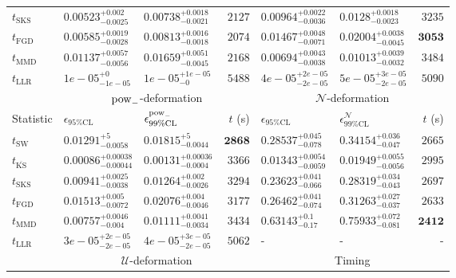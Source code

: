 \begin{tabular}{l|llr|llr}
	$t_{\mathrm{SKS}}$ & $0.00523_{-0.0025}^{+0.002}$ & $0.00738_{-0.0021}^{+0.0018}$ & $2127$ & $0.00964_{-0.0036}^{+0.0022}$ & $0.0128_{-0.0023}^{+0.0018}$ & $3235$ \\
	$t_{\mathrm{FGD}}$ & $0.00585_{-0.0028}^{+0.0019}$ & $0.00813_{-0.0018}^{+0.0016}$ & $2074$ & $0.01467_{-0.0071}^{+0.0048}$ & $0.02004_{-0.0045}^{+0.0038}$ & ${\mathbf{3053}}$ \\
	$t_{\mathrm{MMD}}$ & $0.01137_{-0.0056}^{+0.0057}$ & $0.01659_{-0.0045}^{+0.0051}$ & $2168$ & $0.00694_{-0.0038}^{+0.0043}$ & $0.01013_{-0.0032}^{+0.0039}$ & $3484$ \\
	$t_{\mathrm{LLR}}$ & $1e-05_{-1e-05}^{+0}$ & $1e-05_{-0}^{+1e-05}$ & $5488$ & $4e-05_{-2e-05}^{+2e-05}$ & $5e-05_{-2e-05}^{+3e-05}$ & $5090$ \\
	\toprule
	\multicolumn{1}{c}{} & \multicolumn{3}{c}{$\rm{pow}_{-}$-deformation} & \multicolumn{3}{c}{$\mathcal{N}$-deformation} \\
	Statistic & $\epsilon_{95\%\mathrm{CL}}$ & $\epsilon^  {\rm{pow}_{-}}_{99\%\mathrm{CL}}$ & $t$ (s) & $\epsilon_{95\%\mathrm{CL}}$ & $\epsilon^    {\mathcal{N}}_{99\%\mathrm{CL}}$ & $t$ (s) \\
	\midrule
	$t_{\mathrm{SW}}$ & $0.01291_{-0.0058}^{+5}$ & $0.01815_{-0.0044}^{+5}$ & ${\mathbf{2868}}$ & $0.28537_{-0.078}^{+0.045}$ & $0.34154_{-0.047}^{+0.036}$ & $2665$ \\
	$t_{\overline{\mathrm{KS}}}$ & ${\mathbf{0.00086_{-0.00044}^{+0.00038}}}$ & ${\mathbf{0.00131_{-0.0004}^{+0.00036}}}$ & $3366$ & ${\mathbf{0.01343_{-0.0059}^{+0.0054}}}$ & ${\mathbf{0.01949_{-0.0056}^{+0.0055}}}$ & $2995$ \\
	$t_{\mathrm{SKS}}$ & $0.00941_{-0.0038}^{+0.0025}$ & $0.01264_{-0.0026}^{+0.002}$ & $3294$ & $0.23623_{-0.066}^{+0.041}$ & $0.28319_{-0.043}^{+0.034}$ & $2697$ \\
	$t_{\mathrm{FGD}}$ & $0.01513_{-0.0072}^{+0.005}$ & $0.02076_{-0.0046}^{+0.004}$ & $3177$ & $0.26462_{-0.074}^{+0.041}$ & $0.31263_{-0.037}^{+0.027}$ & $2633$ \\
	$t_{\mathrm{MMD}}$ & $0.00757_{-0.004}^{+0.0046}$ & $0.01111_{-0.0034}^{+0.0041}$ & $3434$ & $0.63143_{-0.17}^{+0.1}$ & $0.75933_{-0.081}^{+0.072}$ & ${\mathbf{2412}}$ \\
	$t_{\mathrm{LLR}}$ & $3e-05_{-2e-05}^{+2e-05}$ & $4e-05_{-2e-05}^{+3e-05}$ & $5062$ & - & - & - \\
	\toprule
	\multicolumn{1}{c}{} & \multicolumn{3}{c}{$\mathcal{U}$-deformation} & \multicolumn{3}{c}{Timing} \\

\end{tabular}
